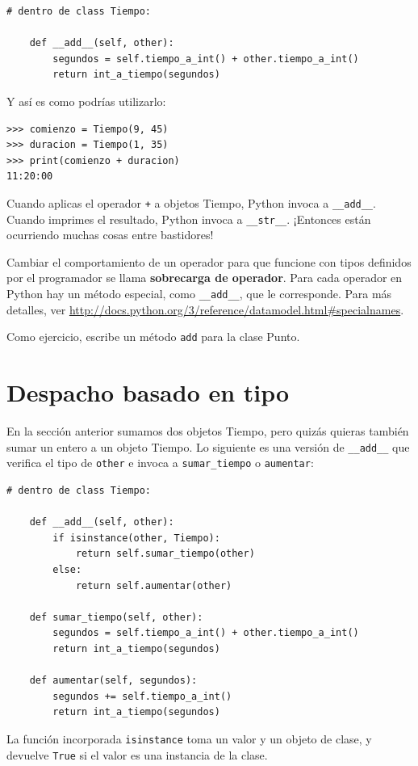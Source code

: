 \documentclass[10pt]{book}
\begin{document}
\begin{verbatim}
# dentro de class Tiempo:

    def __add__(self, other):
        segundos = self.tiempo_a_int() + other.tiempo_a_int()
        return int_a_tiempo(segundos)
\end{verbatim}
%
Y así es como podrías utilizarlo:

\begin{verbatim}
>>> comienzo = Tiempo(9, 45)
>>> duracion = Tiempo(1, 35)
>>> print(comienzo + duracion)
11:20:00
\end{verbatim}
%
Cuando aplicas el operador {\tt +} a objetos Tiempo, Python invoca a
\verb"__add__".  Cuando imprimes el resultado, Python invoca a
\verb"__str__".  ¡Entonces están ocurriendo muchas cosas entre bastidores!

Cambiar el comportamiento de un operador para que funcione con
tipos definidos por el programador se llama {\bf sobrecarga de operador}.  Para cada
operador en Python hay un método especial, como
\verb"__add__", que le corresponde.  Para más detalles, ver
\url{http://docs.python.org/3/reference/datamodel.html#specialnames}.

Como ejercicio, escribe un método {\tt add} para la clase Punto.


\section{Despacho basado en tipo}

En la sección anterior sumamos dos objetos Tiempo, pero quizás
quieras también sumar un entero a un objeto Tiempo.  Lo
siguiente es una versión de \verb"__add__"
que verifica el tipo de {\tt other} e invoca a
\verb"sumar_tiempo" o {\tt aumentar}:

\begin{verbatim}
# dentro de class Tiempo:

    def __add__(self, other):
        if isinstance(other, Tiempo):
            return self.sumar_tiempo(other)
        else:
            return self.aumentar(other)

    def sumar_tiempo(self, other):
        segundos = self.tiempo_a_int() + other.tiempo_a_int()
        return int_a_tiempo(segundos)

    def aumentar(self, segundos):
        segundos += self.tiempo_a_int()
        return int_a_tiempo(segundos)
\end{verbatim}
%
La función incorporada {\tt isinstance} toma un valor y un
objeto de clase, y devuelve {\tt True} si el valor es una instancia
de la clase.
\end{document}
